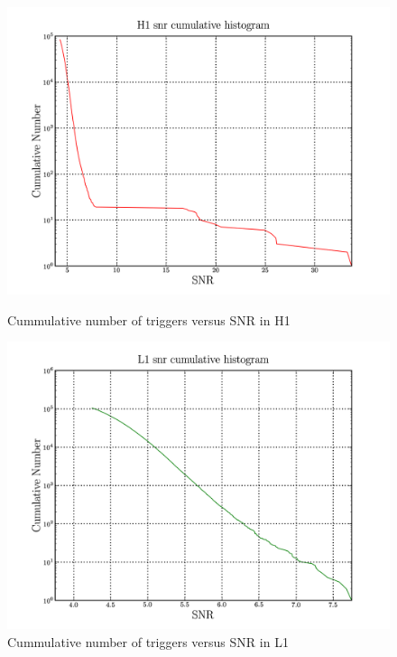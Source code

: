 \documentclass[epsf]{article}
\begin{document}
\begin{figure}[ht]
\begin{minipage}[b]{0.5\linewidth}
\centering
\includegraphics[scale=0.15]{H1_cumno_SNR.png}
\caption{Cummulative number of triggers versus SNR in H1}
\label{fig:figure3}
\end{minipage}
\hspace{0.5cm}
\begin{minipage}[b]{0.5\linewidth}
\centering
\includegraphics[scale=0.15]{L1_cumno_SNR.png}
\caption{Cummulative number of triggers versus SNR in L1}
\label{fig:figure4}
\end{minipage}
\end{figure}
\end{document}
